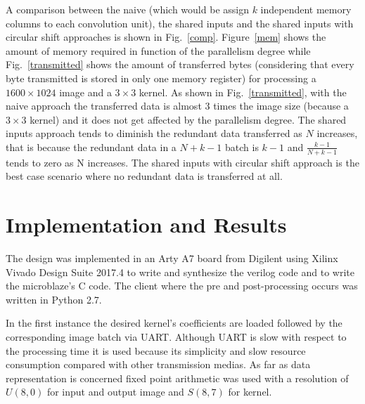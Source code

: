 \documentclass[conference,compsoc]{IEEEtran}
\begin{document}
A comparison between the naive (which would be assign $k$ independent
memory columns to each convolution unit), the shared inputs and the
shared inputs with circular shift approaches is shown in Fig.~\ref{comp}.
Figure~\ref{mem} shows the amount of memory required in function of the
parallelism degree while Fig.~\ref{transmitted} shows the amount of transferred
bytes (considering that every byte transmitted is stored in only one memory
register) for processing a $1600\times1024$ image and a $3\times3$ kernel. As
shown in Fig.~\ref{transmitted}, with the naive approach the transferred data is
almost $3$ times the image size (because a $3\times3$ kernel) and it does not
get affected by the parallelism degree. The shared inputs approach tends to
diminish the redundant data transferred as $N$ increases, that is because the
redundant data in a $N+k-1$ batch is $k-1$ and $\frac{k-1}{N+k-1}$ tends to zero
as N increases. The shared inputs with circular shift approach is the best case
scenario where no redundant data is transferred at all.


\section{Implementation and Results}\label{sec:implementation}

The design was implemented in an Arty A7 board from Digilent using Xilinx
Vivado Design Suite 2017.4 to write and synthesize the verilog code and to write
the microblaze's C code. The client where the pre and post-processing occurs was
written in Python 2.7.

In the first instance the desired kernel's coefficients are loaded followed by
the corresponding image batch via UART\@. Although UART is slow with respect to
the processing time it is used because its simplicity and slow resource
consumption compared with other transmission medias.
As far as data representation is concerned fixed point arithmetic was used with
a resolution of $U(8,0)$ for input and output image and $S(8,7)$ for kernel.
\end{document}
